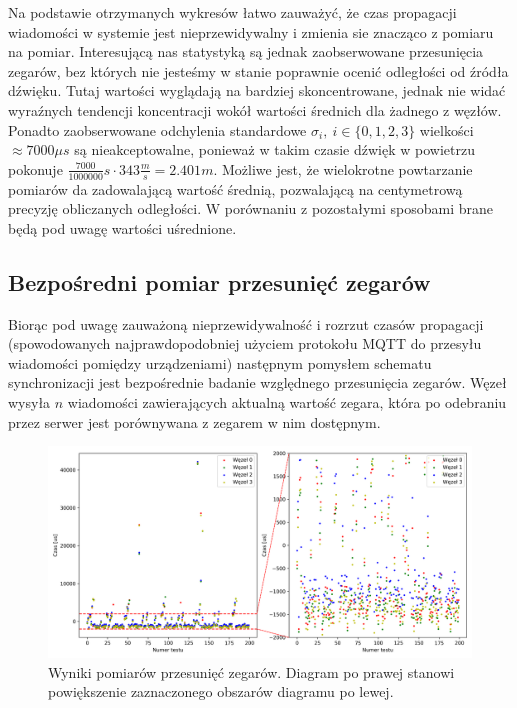 Na podstawie otrzymanych wykresów łatwo zauważyć, że czas propagacji wiadomości w systemie jest nieprzewidywalny i zmienia sie znacząco z pomiaru na pomiar. Interesującą nas statystyką są jednak zaobserwowane przesunięcia zegarów, bez których nie jesteśmy w stanie poprawnie ocenić odległości od źródła dźwięku. Tutaj wartości wyglądają na bardziej skoncentrowane, jednak nie widać wyraźnych tendencji koncentracji wokół wartości średnich dla żadnego z węzłów. Ponadto zaobserwowane odchylenia standardowe $\sigma_i,\ i \in \{0,1,2,3\}$ wielkości $\approx 7000 \mu s$ są nieakceptowalne, ponieważ w takim czasie dźwięk w powietrzu pokonuje $\frac{7000}{1000000}s \cdot 343\frac{m}{s} = 2.401m$. Możliwe jest, że wielokrotne powtarzanie pomiarów da zadowalającą wartość średnią, pozwalającą na centymetrową precyzję obliczanych odległości. W porównaniu z pozostałymi sposobami brane będą pod uwagę wartości uśrednione.

\subsection{Bezpośredni pomiar przesunięć zegarów}\label{sec:time_deltas_sync}

Biorąc pod uwagę zauważoną nieprzewidywalność i rozrzut czasów propagacji (spowodowanych najprawdopodobniej użyciem protokołu MQTT do przesyłu wiadomości pomiędzy urządzeniami) następnym pomysłem schematu synchronizacji jest bezpośrednie badanie względnego przesunięcia zegarów. Węzeł wysyła $n$ wiadomości zawierających aktualną wartość zegara, która po odebraniu przez serwer jest porównywana z zegarem w nim dostępnym.

\begin{figure}[H]
    \centering
    \includegraphics[width=\textwidth]{pics/time_deltas/time_deltas.png}
    \caption[Wyniki pomiarów przesunięć zegarów]{Wyniki pomiarów przesunięć zegarów. Diagram po prawej stanowi powiększenie zaznaczonego obszarów diagramu po lewej.}
    \label{pic:offsets_deltas}
\end{figure}

